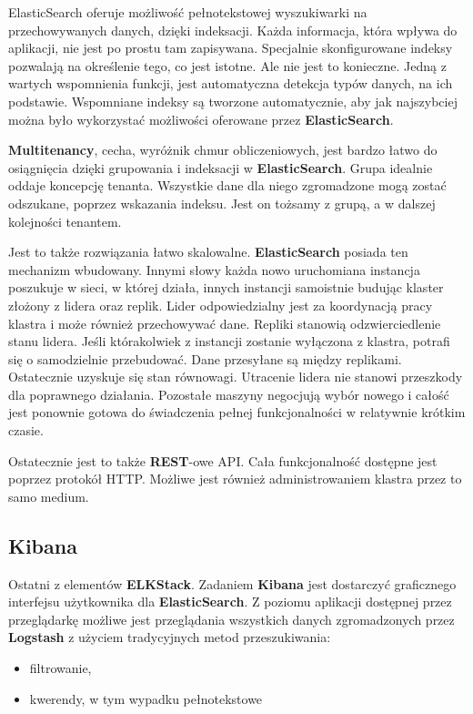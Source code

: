     ElasticSearch oferuje możliwość pełnotekstowej wyszukiwarki na przechowywanych danych, dzięki
    indeksacji. Każda informacja, która wpływa do aplikacji, nie jest po prostu tam zapisywana.
    Specjalnie skonfigurowane indeksy pozwalają na określenie tego, co jest istotne. Ale nie jest
    to konieczne. Jedną z wartych wspomnienia funkcji, jest automatyczna detekcja typów danych, na ich
    podstawie. Wspomniane indeksy są tworzone automatycznie, aby jak najszybciej można było
    wykorzystać możliwości oferowane przez \textbf{ElasticSearch}.
    
    \textbf{Multitenancy}, cecha, wyróżnik chmur obliczeniowych, jest bardzo łatwo do osiągnięcia
    dzięki grupowania i indeksacji w \textbf{ElasticSearch}. Grupa idealnie oddaje koncepcję tenanta.
    Wszystkie dane dla niego zgromadzone mogą zostać odszukane, poprzez wskazania indeksu. Jest on
    tożsamy z grupą, a w dalszej kolejności tenantem.
    
    Jest to także rozwiązania łatwo skalowalne. \textbf{ElasticSearch} posiada ten mechanizm wbudowany.
    Innymi słowy każda nowo uruchomiana instancja poszukuje w sieci, w której działa, innych instancji
    samoistnie budując klaster złożony z lidera oraz replik. 
    Lider odpowiedzialny jest za koordynacją pracy klastra i może również przechowywać dane.
    Repliki stanowią odzwierciedlenie stanu lidera. Jeśli którakolwiek z instancji zostanie wyłączona z klastra,
    potrafi się o samodzielnie przebudować. Dane przesyłane są między replikami. Ostatecznie uzyskuje się
    stan równowagi. Utracenie lidera nie stanowi przeszkody dla poprawnego działania. Pozostałe maszyny 
    negocjują wybór nowego i całość jest ponownie gotowa do świadczenia pełnej funkcjonalności w relatywnie
    krótkim czasie.

    Ostatecznie jest to także \textbf{REST}-owe API. Cała funkcjonalność dostępne jest poprzez
    protokół HTTP. Możliwe jest również administrowaniem klastra przez to samo medium.

\subsection{Kibana}
\label{chapter:application:elkstack:kibana}

    Ostatni z elementów \textbf{ELKStack}. Zadaniem \textbf{Kibana} jest dostarczyć graficznego interfejsu
    użytkownika dla \textbf{ElasticSearch}. Z poziomu aplikacji dostępnej przez przeglądarkę możliwe
    jest przeglądania wszystkich danych zgromadzonych przez \textbf{Logstash} z użyciem tradycyjnych
    metod przeszukiwania:
    \begin{itemize}
        \item filtrowanie,
        \item kwerendy, w tym wypadku pełnotekstowe
    \end{itemize}
    
